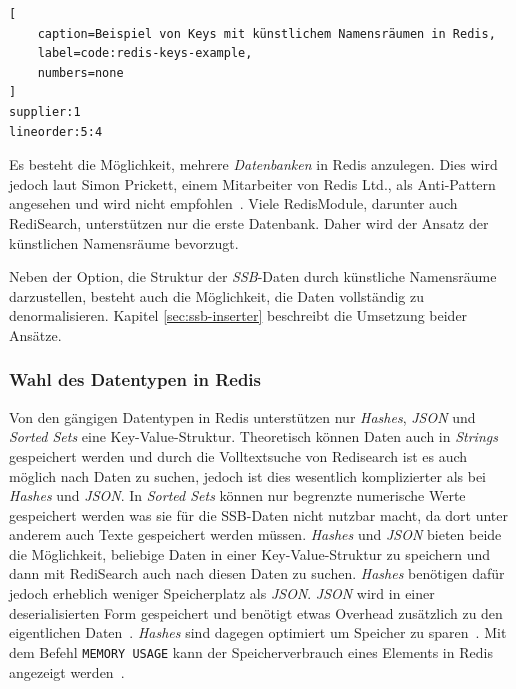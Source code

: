 \begin{lstlisting}[
    caption=Beispiel von Keys mit künstlichem Namensräumen in Redis,
    label=code:redis-keys-example,
    numbers=none
]
supplier:1
lineorder:5:4
\end{lstlisting}


Es besteht die Möglichkeit, mehrere \emph{Datenbanken} in Redis anzulegen.
Dies wird jedoch laut Simon Prickett, einem Mitarbeiter von Redis Ltd., als Anti-Pattern angesehen und wird nicht empfohlen~\cite{prickett_answer_2022}. Viele RedisModule, darunter auch RediSearch, unterstützen nur die erste Datenbank. Daher wird der Ansatz der künstlichen Namensräume bevorzugt. 

Neben der Option, die Struktur der \emph{SSB}-Daten durch künstliche Namensräume darzustellen, besteht auch die Möglichkeit, die Daten vollständig zu denormalisieren. Kapitel \ref{sec:ssb-inserter} beschreibt die Umsetzung beider Ansätze.


\subsubsection{Wahl des Datentypen in Redis}
Von den gängigen Datentypen in Redis unterstützen nur \emph{Hashes}, \emph{JSON} und \emph{Sorted Sets} eine Key-Value-Struktur. Theoretisch können Daten auch in \emph{Strings} gespeichert werden und durch die Volltextsuche von Redisearch ist es auch möglich nach Daten zu suchen, jedoch ist dies wesentlich komplizierter als bei \emph{Hashes} und \emph{JSON}.
In \emph{Sorted Sets} können nur begrenzte numerische Werte gespeichert werden was sie für die SSB-Daten nicht nutzbar macht, da dort unter anderem auch Texte gespeichert werden müssen.
\emph{Hashes} und \emph{JSON} bieten beide die Möglichkeit, beliebige Daten in einer Key-Value-Struktur zu speichern und dann mit RediSearch auch nach diesen Daten zu suchen.
\emph{Hashes} benötigen dafür jedoch erheblich weniger Speicherplatz als \emph{JSON}.
\emph{JSON} wird in einer deserialisierten Form gespeichert und benötigt etwas Overhead zusätzlich zu den eigentlichen Daten~\cite{redis_ltd_json-ram-usage_nodate}.
\emph{Hashes} sind dagegen optimiert um Speicher zu sparen~\cite{redis_ltd_memory-optimization_nodate}.
Mit dem Befehl \lstinline|MEMORY USAGE| kann der Speicherverbrauch eines Elements in Redis angezeigt werden~\cite{redis_ltd_memory-usage-command-redis_nodate}.


